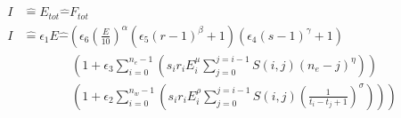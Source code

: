 \begin{equation}
	\label{eq:PotentialSurfaceEquation}
	\begin{split}
		I & \hat{=} E_{tot} \hat{-} F_{tot} \\
		I & \hat{=} \epsilon_1 E \hat{-} 
			\left(
				\epsilon_6 \left( \frac{E}{10} \right)^\alpha
				\left( \epsilon_5 (r-1)^\beta + 1 \right)
				\left( \epsilon_4 (s-1)^\gamma+1 \right)
				\right.
				\\
				& \;\;\;\;\;\;\;\;\;\;\;\;\;\;
				\left(
					1+\epsilon_3 \sum_{i=0}^{n_e-1} \left( 
						s_i r_i E_i^\mu 
						\sum_{j=0}^{j=i-1} S(i,j)(n_e-j)^\eta
					\right)
				\right)
				\\
				& \;\;\;\;\;\;\;\;\;\;\;\;\;\;
				\left.
				\left(
					1+\epsilon_2 \sum_{i=0}^{n_w-1} \left( 
						s_i r_i E_i^\rho
						\sum_{j=0}^{j=i-1} S(i,j)\left(
							\frac{1}{t_i-t_j+1}
						\right)^\sigma
					\right)
				\right)
			\right)
	\end{split}
\end{equation}








